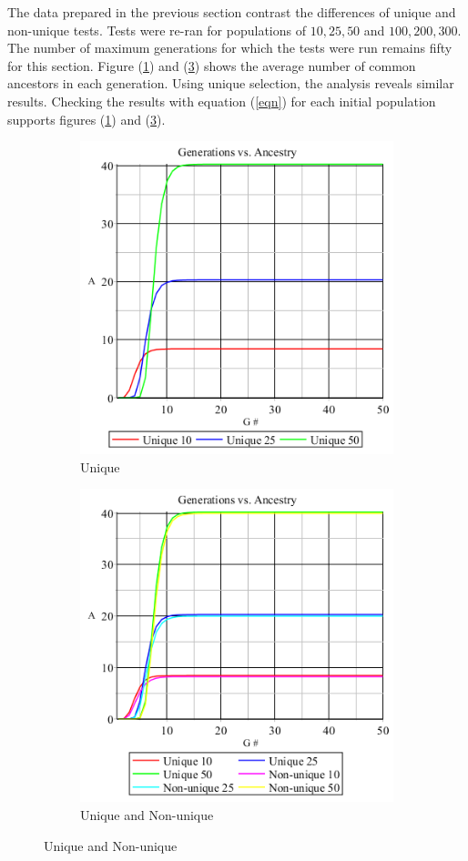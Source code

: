 \documentclass[12pt]{extarticle}
\begin{document}
The data prepared in the previous section contrast the differences of unique and non-unique tests. Tests were re-ran for populations of $10, 25, 50$ and $100, 200, 300$. The number of maximum generations for which the tests were run remains fifty for this section. Figure (\ref{fig:img4}) and (\ref{fig:img5}) shows the average number of common ancestors in each generation. Using unique selection, the analysis reveals similar results. Checking the results with equation (\ref{eqn}) for each initial population supports figures (\ref{fig:img4}) and (\ref{fig:img5}).
\begin{figure}[h!]
	\caption{Unique and Non-Unique Analysis}
	\begin{subfigure}{0.50\textwidth}
		\includegraphics[scale=0.50]{Graph4.png}
		\caption{Unique}
		\label{fig:img4}
	\end{subfigure}
	\begin{subfigure}{0.50\textwidth}
		\includegraphics[scale=0.50]{Graph5.png}
		\caption{Unique and Non-unique}
		\label{fig:img5}
	\end{subfigure}
\end{figure}
\end{document}

